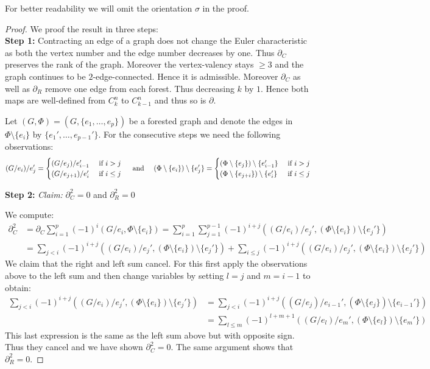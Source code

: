 For better readability we will omit the orientation $\sigma$ in the proof.
\begin{proof}


	We proof the result in three steps:\\
	\textbf{Step 1:} Contracting an edge of a graph does not change the Euler characteristic as both the vertex number and the edge number decreases by one.
	Thus $\partial_{C}$ preserves the rank of the graph. Moreover the vertex-valency stays $\geq 3$ and the graph continues to be $2$-edge-connected.
	Hence it is admissible.
	Moreover $\partial_{C}$ as well as $\partial_{R}$ remove one edge from each forest. Thus decreasing
	$k$ by $1$. Hence both maps are well-defined from $C^{n}_{k}$ to $C^{n}_{k-1}$ and thus so is $\partial$.

	Let $(G,\Phi) = (G, \{e_1,\ldots,e_{p}\})$ be a forested graph and denote the edges in $\Phi \setminus \{e_{i}\}$ by $\{e_1',\ldots,e_{p-1}'\}$.
	For the consecutive steps we need the following observations:
	\[
		(G / e_{i}) /  e_{j}' = \begin{cases}
			(G / e_{j}) / e_{i-1}' & \text{ if } i > j\\
			(G / e_{j+1}) / e_{i}' & \text{ if } i \leq j
		\end{cases}
		\qq{ and }
		(\Phi \setminus \{e_{i}\}) \setminus \{e_{j}'\}  = \begin{cases}	
			(\Phi \setminus \{e_{j}\}) \setminus \{e_{i-1}'\} & \text{ if } i > j\\
			(\Phi \setminus \{e_{j+i}\}) \setminus \{e_{i}'\} & \text{ if } i \leq j
		\end{cases}
	\]

	\textbf{Step 2:}\enskip
	\emph{Claim:}
		$\partial_{C}^2 = 0$ and $\partial_{R}^2 = 0$

	We compute:
	\begin{align*}
		\partial_{C}^2 &= \partial_{C} \sum_{i=1}^{p} (-1)^{i}(G / e_{i}, \Phi \setminus \{e_{i}\})
		=  \sum_{i=1}^{p} \sum_{j=1}^{p-1} (-1)^{i+j}((G / e_{i}) / e_{j}', (\Phi \setminus \{e_{i}\} ) \setminus \{e_{j}'\})  \\
					   &= \sum_{j < i} (-1)^{i+j} ((G / e_{i}) / e_{j}', (\Phi \setminus \{e_{i}\} ) \setminus \{e_{j}'\}) + \sum_{i \leq j} (-1)^{i+j}
					   ((G / e_{i}) / e_{j}', (\Phi \setminus \{e_{i}\} ) \setminus \{e_{j}'\}) 
	\end{align*}
	We claim that the right and left sum cancel. For this first apply the observations above to the left sum and then change variables by setting $l = j$ and  $m = i-1$ to obtain:
	\begin{align*}
		\sum_{j < i} (-1)^{i+j} ((G / e_{i}) / e_{j}', (\Phi \setminus \{e_{i}\}) \setminus \{e_{j}'\} ) &= 
		\sum_{j < i} (-1)^{i+j}((G / e_{j}) / e_{i-1}', (\Phi \setminus \{e_{j}\}) \setminus \{e_{i-1}'\} ) \\ 
		&= \sum_{l \leq m} (-1)^{l+m+1} ((G / e_{l}) / e_{m}', (\Phi \setminus \{e_{l}\}) \setminus \{e_{m}'\} ) 
	\end{align*}
	This last expression is the same as the left sum above but with opposite sign. Thus they cancel and we have shown $\partial_{C}^2 = 0$.
	The same argument shows that $\partial_{R}^2 = 0$.


\end{proof}

